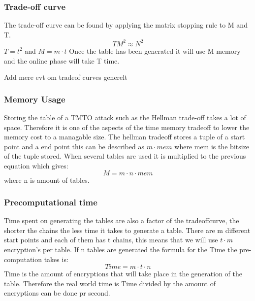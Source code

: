 \subsubsection{Trade-off curve}
The trade-off curve can be found by applying the matrix stopping rule to M and T.
\begin{equation}
TM^2\approx N^2
\end{equation}
$T=t^2$ and $M=m\cdot t$
Once the table has been generated it will use M memory and the online phase will take T time.

Add mere evt om tradeof curves generelt
\subsubsection{Memory Usage}
Storing the table of a TMTO attack such as the Hellman trade-off takes a lot of space. Therefore it is one of the aspects of the time memory tradeoff to lower the memory cost to a managable size. The hellman tradeoff stores a tuple of a start point and a end point this can be described as $m\cdot mem$ where mem is the bitsize of the  tuple stored. When several tables are used it is multiplied to the previous equation which gives:
\begin{equation}
M=m\cdot n\cdot mem
\end{equation}
where n is amount of tables.
\subsubsection{Precomputational time}
Time spent on generating the tables are also a factor of the tradeoffcurve, the shorter the chains the less time it takes to generate a table. There are m different start points and each of them has t chains, this means that we will use $t\cdot m$ encryption's per table. If n tables are generated the formula for the Time the pre-computation takes is:
\begin{equation}
  Time=m\cdot t\cdot n
\end{equation}
Time is the amount of encryptions that will take place in the generation of the table. Therefore the real world time is Time divided by the amount of encryptions can be done pr second.

